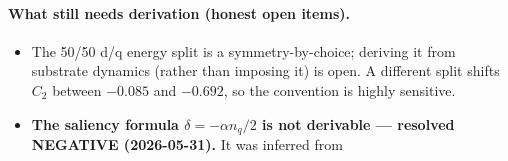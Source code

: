 \paragraph{What still needs derivation (honest open items).}
\begin{itemize}
    \item The 50/50 d/q energy split is a symmetry-by-choice; deriving
    it from substrate dynamics (rather than imposing it) is open. A
    different split shifts $C_2$ between $-0.085$ and $-0.692$, so the
    convention is highly sensitive.
    \item \textbf{The saliency formula $\delta = -\alpha n_q/2$ is not
    derivable --- resolved NEGATIVE (2026-05-31).} It was inferred from

\end{itemize}
